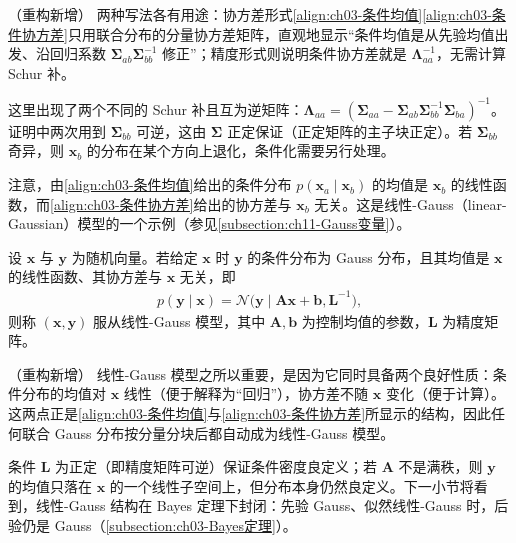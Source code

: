 \documentclass[../../main.tex]{subfiles}
\begin{document}
\begin{remark}（重构新增）
两种写法各有用途：协方差形式\eqref{align:ch03-条件均值}\eqref{align:ch03-条件协方差}只用联合分布的分量协方差矩阵，直观地显示“条件均值是从先验均值出发、沿回归系数 $\boldsymbol{\Sigma}_{ab}\boldsymbol{\Sigma}_{bb}^{-1}$ 修正”；精度形式则说明条件协方差就是 $\boldsymbol{\Lambda}_{aa}^{-1}$，无需计算 Schur 补。

这里出现了两个不同的 Schur 补且互为逆矩阵：$\boldsymbol{\Lambda}_{aa}=(\boldsymbol{\Sigma}_{aa}-\boldsymbol{\Sigma}_{ab}\boldsymbol{\Sigma}_{bb}^{-1}\boldsymbol{\Sigma}_{ba})^{-1}$。证明中两次用到 $\boldsymbol{\Sigma}_{bb}$ 可逆，这由 $\boldsymbol{\Sigma}$ 正定保证（正定矩阵的主子块正定）。若 $\boldsymbol{\Sigma}_{bb}$ 奇异，则 $\boldsymbol{x}_b$ 的分布在某个方向上退化，条件化需要另行处理。
\end{remark}

注意，由\eqref{align:ch03-条件均值}给出的条件分布 $p(\boldsymbol{x}_{a}\mid\boldsymbol{x}_{b})$ 的均值是 $\boldsymbol{x}_{b}$ 的线性函数，而\eqref{align:ch03-条件协方差}给出的协方差与 $\boldsymbol{x}_{b}$ 无关。这是线性-Gauss（linear-Gaussian）模型的一个示例（参见\cref{subsection:ch11-Gauss变量}）。

\begin{definition}[线性-Gauss 模型]\label{definition:ch03-线性Gauss模型}
设 $\boldsymbol{x}$ 与 $\boldsymbol{y}$ 为随机向量。若给定 $\boldsymbol{x}$ 时 $\boldsymbol{y}$ 的条件分布为 Gauss 分布，且其均值是 $\boldsymbol{x}$ 的线性函数、其协方差与 $\boldsymbol{x}$ 无关，即
\begin{align}
p(\boldsymbol{y}\mid\boldsymbol{x})=\mathcal{N}\bigl(\boldsymbol{y}\mid\boldsymbol{A}\boldsymbol{x}+\boldsymbol{b},\boldsymbol{L}^{-1}\bigr),
\label{align:ch03-线性Gauss模型}
\end{align}
则称 $(\boldsymbol{x},\boldsymbol{y})$ 服从线性-Gauss 模型，其中 $\boldsymbol{A},\boldsymbol{b}$ 为控制均值的参数，$\boldsymbol{L}$ 为精度矩阵。
\end{definition}

\begin{remark}（重构新增）
线性-Gauss 模型之所以重要，是因为它同时具备两个良好性质：条件分布的均值对 $\boldsymbol{x}$ 线性（便于解释为“回归”），协方差不随 $\boldsymbol{x}$ 变化（便于计算）。这两点正是\eqref{align:ch03-条件均值}与\eqref{align:ch03-条件协方差}所显示的结构，因此任何联合 Gauss 分布按分量分块后都自动成为线性-Gauss 模型。

条件 $\boldsymbol{L}$ 为正定（即精度矩阵可逆）保证条件密度良定义；若 $\boldsymbol{A}$ 不是满秩，则 $\boldsymbol{y}$ 的均值只落在 $\boldsymbol{x}$ 的一个线性子空间上，但分布本身仍然良定义。下一小节将看到，线性-Gauss 结构在 Bayes 定理下封闭：先验 Gauss、似然线性-Gauss 时，后验仍是 Gauss（\cref{subsection:ch03-Bayes定理}）。
\end{remark}
\end{document}
